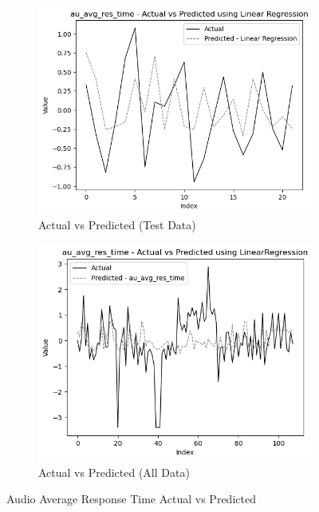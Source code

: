 \begin{figure}[htbp]
    \centering
    \begin{subfigure}[b]{0.49\textwidth}
        \centering
        \includegraphics[width=\textwidth]{images/regressionCharts/test_data_audio_average_response_time.png}
        \caption{Actual vs Predicted (Test Data)}
        \label{fig:actual_vs_predicted_au_avg_res_time_test}
    \end{subfigure}\hfill
    \begin{subfigure}[b]{0.49\textwidth}
        \centering
        \includegraphics[width=\textwidth]{images/regressionCharts/all_data_audio_average_response_time.png}
        \caption{Actual vs Predicted (All Data)}
        \label{fig:actual_vs_predicted_au_avg_res_time_all_data}
    \end{subfigure}
    \caption{Audio Average Response Time Actual vs Predicted}
    \label{fig:audio_avg_response_time_comparison}
\end{figure}

